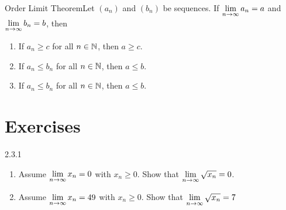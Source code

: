\begin{ntheorem}
    {Order Limit Theorem}Let \((a_n)\) and \((b_n)\) be sequences. If \(\displaystyle \lim_{n \rightarrow \infty}a_n = a\) and \(\displaystyle \lim_{n \rightarrow \infty}b_n = b\), then
    \begin{enumerate}[label=(\roman*)]
        \item If \(a_n \geq c\) for all \(n \in \mathbb{N}\), then \(a \geq c\).
        \item If \(a_n \leq b_n\) for all \(n \in \mathbb{N}\), then \(a \leq b\).
        \item If \(a_n \leq b_n\) for all \(n \in \mathbb{N}\), then \(a \leq b\).
    \end{enumerate}
\end{ntheorem}



\section*{Exercises}

\begin{exercise}
    {2.3.1}
    \begin{enumerate}
        \item Assume \(\displaystyle \lim_{n \rightarrow \infty}x_n = 0\) with \(x_n \geq 0\). Show that \(\displaystyle \lim_{n \rightarrow \infty}\sqrt{x_n} = 0\).
        \item Assume \(\displaystyle \lim_{n \rightarrow \infty}x_n = 49\) with \(x_n \geq 0\). Show that \(\displaystyle \lim_{n \rightarrow \infty}\sqrt{x_n} = 7\)
    \end{enumerate}
\end{exercise}


